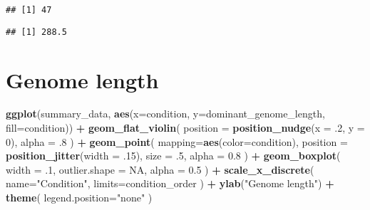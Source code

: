 \documentclass[]{book}
\newenvironment{Shaded}{\begin{snugshade}}{\end{snugshade}}
\newcommand{\DataTypeTok}[1]{\textcolor[rgb]{0.13,0.29,0.53}{#1}}
\newcommand{\DecValTok}[1]{\textcolor[rgb]{0.00,0.00,0.81}{#1}}
\newcommand{\FloatTok}[1]{\textcolor[rgb]{0.00,0.00,0.81}{#1}}
\newcommand{\KeywordTok}[1]{\textcolor[rgb]{0.13,0.29,0.53}{\textbf{#1}}}
\newcommand{\NormalTok}[1]{#1}
\newcommand{\OperatorTok}[1]{\textcolor[rgb]{0.81,0.36,0.00}{\textbf{#1}}}
\newcommand{\OtherTok}[1]{\textcolor[rgb]{0.56,0.35,0.01}{#1}}
\newcommand{\StringTok}[1]{\textcolor[rgb]{0.31,0.60,0.02}{#1}}
\begin{document}
\begin{Shaded}
\end{Shaded}

\begin{verbatim}
## [1] 47
\end{verbatim}

\begin{Shaded}
\end{Shaded}

\begin{verbatim}
## [1] 288.5
\end{verbatim}

\hypertarget{genome-length}{%
\section{Genome length}\label{genome-length}}

\begin{Shaded}
\begin{Highlighting}[]
\KeywordTok{ggplot}\NormalTok{(summary_data, }\KeywordTok{aes}\NormalTok{(}\DataTypeTok{x=}\NormalTok{condition, }\DataTypeTok{y=}\NormalTok{dominant_genome_length, }\DataTypeTok{fill=}\NormalTok{condition)) }\OperatorTok{+}
\StringTok{  }\KeywordTok{geom_flat_violin}\NormalTok{(}
    \DataTypeTok{position =} \KeywordTok{position_nudge}\NormalTok{(}\DataTypeTok{x =} \FloatTok{.2}\NormalTok{, }\DataTypeTok{y =} \DecValTok{0}\NormalTok{),}
    \DataTypeTok{alpha =} \FloatTok{.8}
\NormalTok{  ) }\OperatorTok{+}
\StringTok{  }\KeywordTok{geom_point}\NormalTok{(}
    \DataTypeTok{mapping=}\KeywordTok{aes}\NormalTok{(}\DataTypeTok{color=}\NormalTok{condition),}
    \DataTypeTok{position =} \KeywordTok{position_jitter}\NormalTok{(}\DataTypeTok{width =} \FloatTok{.15}\NormalTok{),}
    \DataTypeTok{size =} \FloatTok{.5}\NormalTok{,}
    \DataTypeTok{alpha =} \FloatTok{0.8}
\NormalTok{  ) }\OperatorTok{+}
\StringTok{  }\KeywordTok{geom_boxplot}\NormalTok{(}
    \DataTypeTok{width =} \FloatTok{.1}\NormalTok{,}
    \DataTypeTok{outlier.shape =} \OtherTok{NA}\NormalTok{,}
    \DataTypeTok{alpha =} \FloatTok{0.5}
\NormalTok{  ) }\OperatorTok{+}
\StringTok{  }\KeywordTok{scale_x_discrete}\NormalTok{(}
    \DataTypeTok{name=}\StringTok{"Condition"}\NormalTok{,}
    \DataTypeTok{limits=}\NormalTok{condition_order}
\NormalTok{  ) }\OperatorTok{+}
\StringTok{  }\KeywordTok{ylab}\NormalTok{(}\StringTok{"Genome length"}\NormalTok{) }\OperatorTok{+}
\StringTok{  }\KeywordTok{theme}\NormalTok{(}
    \DataTypeTok{legend.position=}\StringTok{"none"}
\NormalTok{  )}
\end{Highlighting}
\end{Shaded}
\end{document}
